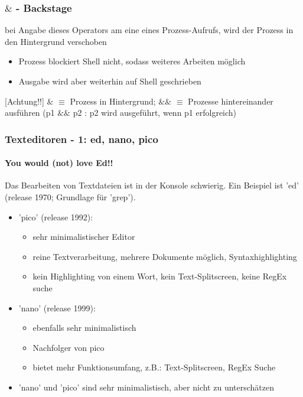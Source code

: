 \documentclass[12pt,utf8]{beamer}
\begin{document}
\begin{frame}
\frametitle{$\&$ - Backstage}
bei Angabe dieses Operators am eine eines Prozess-Aufrufs, wird der Prozess in den Hintergrund verschoben
\begin{itemize}[<+->]
	\item Prozess blockiert Shell nicht, sodass weiteres Arbeiten möglich
	\item Ausgabe wird aber weiterhin auf Shell geschrieben
\end{itemize}
[Achtung!!] $\&$ $\equiv$ Prozess in Hintergrund; $\&\&$ $\equiv$ Prozesse hintereinander ausführen (p1 $\&\&$ p2 : p2 wird ausgeführt, wenn p1 erfolgreich)
\end{frame}

\begin{frame}
\frametitle{Texteditoren - 1: ed, nano, pico}
\framesubtitle{You would (not) love Ed!!}
Das Bearbeiten von Textdateien ist in der Konsole schwierig. Ein Beispiel ist 'ed' (release 1970; Grundlage für 'grep').
\begin{itemize}
	\item 'pico' (release 1992):
	\begin{itemize}[<+->]
		\item sehr minimalistischer Editor
		\item reine Textverarbeitung, mehrere Dokumente möglich, Syntaxhighlighting
		\item kein Highlighting von einem Wort, kein Text-Splitscreen, keine RegEx suche
	\end{itemize}
	\item 'nano' (release 1999):
	\begin{itemize}[<+->]
		\item ebenfalls sehr minimalistisch
		\item Nachfolger von pico
		\item bietet mehr Funktionsumfang, z.B.: Text-Splitscreen, RegEx Suche
	\end{itemize}
	\item 'nano' und 'pico' sind sehr minimalistisch, aber nicht zu unterschätzen
\end{itemize}
\end{frame}
\end{document}

